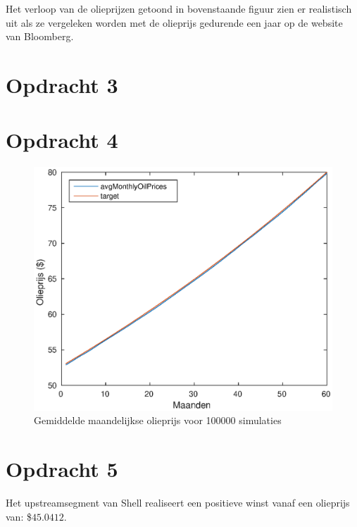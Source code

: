 \documentclass[11pt,a4paper]{article}
\begin{document}
\noindent
Het verloop van de olieprijzen getoond in bovenstaande figuur zien er realistisch uit als ze vergeleken worden met de olieprijs gedurende een jaar op de website van Bloomberg.



\section*{Opdracht 3}



\section*{Opdracht 4}

\begin{figure}[H]
\centering
\includegraphics[scale=0.75]{opdracht4}
\caption{Gemiddelde maandelijkse olieprijs voor 100000 simulaties}
\end{figure}



\section*{Opdracht 5}
Het upstreamsegment van Shell realiseert een positieve winst vanaf een olieprijs van: \$$45.0412$.

\end{document}
